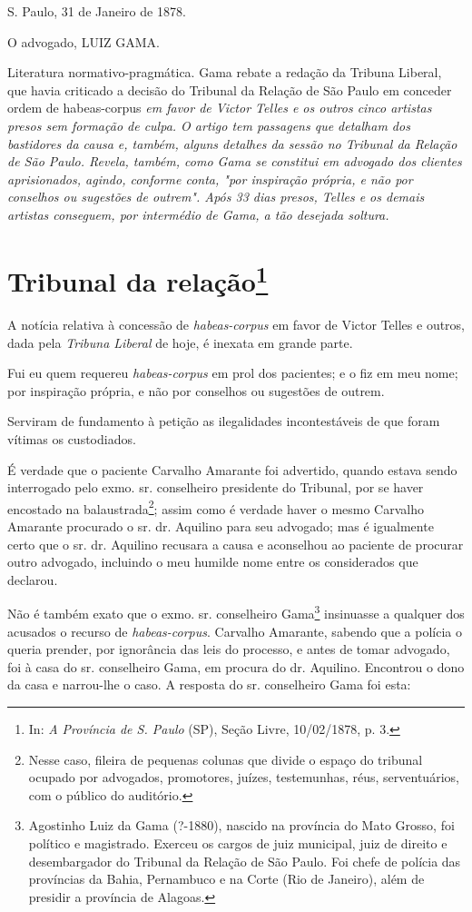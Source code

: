 S. Paulo, 31 de Janeiro de 1878.

O advogado, LUIZ GAMA.

\pagebreak
\mbox{}\vfill
\thispagestyle{empty}

{\small\noindent
Literatura normativo-pragmática. Gama rebate a redação da Tribuna
Liberal, que havia criticado a decisão do Tribunal da Relação de São
Paulo em conceder ordem de} habeas-corpus \emph{em favor de Victor
Telles e os outros cinco artistas presos sem formação de culpa. O artigo
tem passagens que detalham dos bastidores da causa e, também, alguns
detalhes da sessão no Tribunal da Relação de São Paulo. Revela, também,
como Gama se constitui em advogado dos clientes aprisionados, agindo,
conforme conta, "por inspiração própria, e não por conselhos ou
sugestões de outrem". Após 33 dias presos, Telles e os demais artistas
conseguem, por intermédio de Gama, a tão desejada soltura. }

\chapter{Tribunal da relação\footnote[*]{In: \emph{A Província de S.
  Paulo} (SP), Seção Livre, 10/02/1878, p. 3.}}

A notícia relativa à concessão de \emph{habeas-corpus} em favor de
Victor Telles e outros, dada pela \emph{Tribuna Liberal} de hoje, é
inexata em grande parte.

Fui eu quem requereu \emph{habeas-corpus} em prol dos pacientes; e o fiz
em meu nome; por inspiração própria, e não por conselhos ou sugestões de
outrem.

Serviram de fundamento à petição as ilegalidades incontestáveis de que
foram vítimas os custodiados.

É verdade que o paciente Carvalho Amarante foi advertido, quando estava
sendo interrogado pelo exmo. sr. conselheiro presidente do Tribunal, por
se haver encostado na balaustrada\footnote{Nesse caso, fileira de
  pequenas colunas que divide o espaço do tribunal ocupado por
  advogados, promotores, juízes, testemunhas, réus, serventuários, com o
  público do auditório.}; assim como é verdade haver o mesmo Carvalho
Amarante procurado o sr. dr. Aquilino para seu advogado; mas é
igualmente certo que o sr. dr. Aquilino recusara a causa e aconselhou ao
paciente de procurar outro advogado, incluindo o meu humilde nome entre
os considerados que declarou.

Não é também exato que o exmo. sr. conselheiro Gama\footnote{Agostinho
  Luiz da Gama (?-1880), nascido na província do Mato Grosso, foi
  político e magistrado. Exerceu os cargos de juiz municipal, juiz de
  direito e desembargador do Tribunal da Relação de São Paulo. Foi chefe
  de polícia das províncias da Bahia, Pernambuco e na Corte (Rio de
  Janeiro), além de presidir a província de Alagoas.} insinuasse a
qualquer dos acusados o recurso de \emph{habeas-corpus}. Carvalho
Amarante, sabendo que a polícia o queria prender, por ignorância das
leis do processo, e antes de tomar advogado, foi à casa do sr.
conselheiro Gama, em procura do dr. Aquilino. Encontrou o dono da casa e
narrou-lhe o caso. A resposta do sr. conselheiro Gama foi esta:

